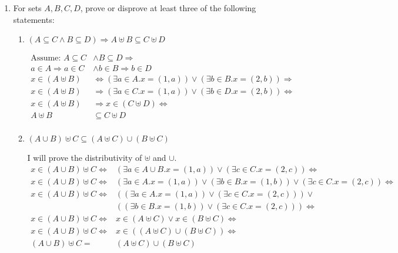 \documentclass[10pt,\jkfside,a4paper]{article}
\begin{document}
\begin{enumerate}
\begin{enumerate}
\end{enumerate}

\item For sets $A, B, C, D$, prove or disprove at least three of the following statements:

\begin{enumerate}

\item $(A \subseteq C \wedge B \subseteq D) \Longrightarrow A \uplus B \subseteq C \uplus D$

\begin{equation}
\begin{split}
\text{Assume: } A \subseteq C &\wedge B \subseteq D \Longrightarrow\\
a \in A \Longrightarrow a \in C &\wedge b \in B \Longrightarrow b \in D\\
x \in (A \uplus B) &\Longleftrightarrow (\exists a \in A. x = (1, a)) \vee (\exists b \in B. x = (2, b)) \Longrightarrow\\
x \in (A \uplus B) &\Longrightarrow (\exists a \in C. x = (1, a)) \vee (\exists b \in D. x = (2, b)) \Longleftrightarrow\\
x \in (A \uplus B) &\Longrightarrow x \in (C \uplus D) \Longleftrightarrow\\
A \uplus B &\subseteq C \uplus D\\
\end{split}
\end{equation}

\item $(A \cup B) \uplus C \subseteq (A \uplus C) \cup (B \uplus C)$

I will prove the distributivity of $\uplus$ and $\cup$.
\begin{equation}\label{upluscup}
\begin{split}
x \in (A \cup B) \uplus C \Longleftrightarrow& (\exists a \in A \cup B. x = (1, a)) \vee (\exists c \in C. x = (2, c)) \Longleftrightarrow\\
x \in (A \cup B) \uplus C \Longleftrightarrow& (\exists a \in A. x = (1, a)) \vee (\exists b \in B. x = (1, b)) \vee (\exists c \in C. x = (2, c)) \Longleftrightarrow\\
x \in (A \cup B) \uplus C \Longleftrightarrow& ((\exists a \in A. x = (1, a)) \vee (\exists c \in C. x = (2, c))) \vee \\
						 &((\exists b \in B. x = (1, b)) \vee (\exists c \in C. x = (2, c))) \Longleftrightarrow\\
x \in (A \cup B) \uplus C \Longleftrightarrow& x \in (A \uplus C) \vee x \in (B \uplus C)\Longleftrightarrow\\
x \in (A \cup B) \uplus C \Longleftrightarrow& x \in ((A \uplus C) \cup (B \uplus C)) \Longleftrightarrow\\
(A \cup B) \uplus C =& (A \uplus C) \cup (B \uplus C)\\
\end{split}
\end{equation}


\end{enumerate}
\end{enumerate}
\end{document}
